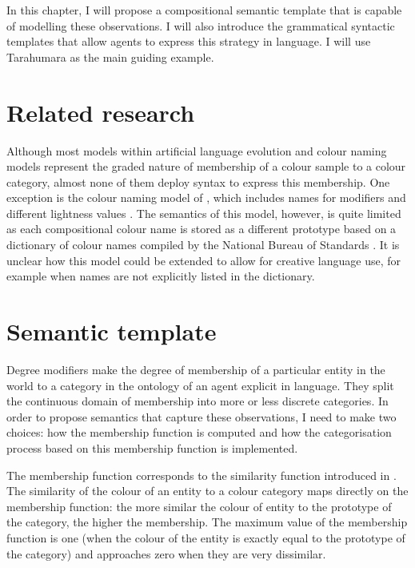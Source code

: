 In this chapter, I will propose a compositional semantic template that
is capable of modelling these observations. I will also introduce the
grammatical syntactic templates that allow agents to express this
strategy in language. I will use Tarahumara as the main guiding
example.

\section{Related research}
\label{s:gms-related-research}

Although most models within artificial language evolution and colour
naming models represent the graded nature of membership of a colour
sample to a colour category, almost none of them deploy syntax to
express this membership. One exception is the colour naming model of
\citeauthor{mojsilovic02method}, which includes names for modifiers
and different lightness values \citep{mojsilovic02method,
  mojsilovic05computational}. The semantics of this model, however, is
quite limited as each compositional colour name is stored as a
different prototype based on a dictionary of colour names compiled by
the National Bureau of Standards \citep{kelly53icss}. It is unclear
how this model could be extended to allow for creative language use,
for example when names are not explicitly listed in the dictionary.

\section{Semantic template}
\label{s:gms-semantic-template}

Degree modifiers make the degree of membership of a particular entity
in the world to a category in the ontology of an agent explicit in
language. They split the continuous domain of membership into more or
less discrete categories. In order to propose semantics that capture
these observations, I need to make two choices: how the membership
function is computed and how the categorisation process based on this
membership function is implemented.

The membership function corresponds to the similarity function
introduced in . The similarity of
the colour of an entity to a colour category maps directly on the
membership function: the more similar the colour of entity to the
prototype of the category, the higher the membership. The maximum
value of the membership function is one (when the colour of the entity
is exactly equal to the prototype of the category) and approaches zero
when they are very dissimilar.

